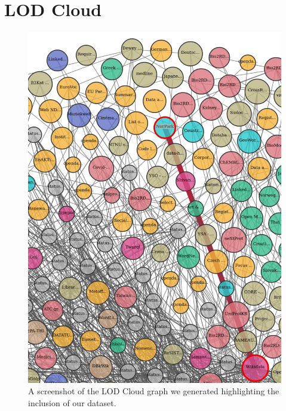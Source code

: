 \chapter{LOD Cloud}
\label{appendix:cloud}
\begin{figure}[H]
	\centering
	\includegraphics[scale=0.25]{figures/graph-screenshot.png}
	\caption{A screenshot of the LOD Cloud graph we generated highlighting the inclusion of our dataset. }
\end{figure}

